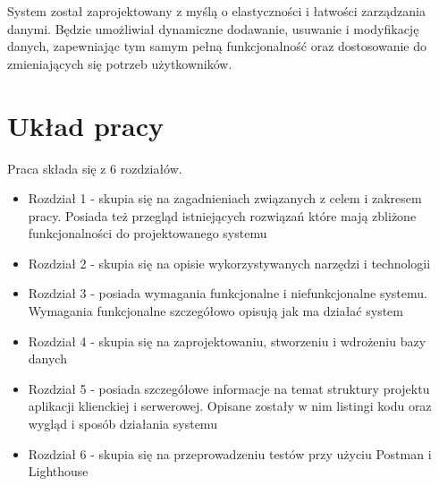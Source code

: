 System został zaprojektowany z myślą o elastyczności i łatwości zarządzania danymi. Będzie umożliwiał dynamiczne dodawanie, usuwanie i modyfikację danych, zapewniając tym samym pełną funkcjonalność oraz dostosowanie do zmieniających się potrzeb użytkowników.


\section{Układ pracy}
Praca składa się z 6 rozdziałów.
\begin {itemize}
	\item Rozdział 1 - skupia się na zagadnieniach związanych z celem i zakresem pracy. Posiada też przegląd istniejących rozwiązań które mają zbliżone funkcjonalności do projektowanego systemu
	\item Rozdział 2 - skupia się na opisie wykorzystywanych narzędzi i technologii
	\item Rozdział 3 - posiada wymagania funkcjonalne i niefunkcjonalne systemu. Wymagania funkcjonalne szczegółowo opisują jak ma działać system
	\item Rozdział 4 - skupia się na zaprojektowaniu, stworzeniu i wdrożeniu bazy danych
	\item Rozdział 5 - posiada szczegółowe informacje na temat struktury projektu aplikacji klienckiej i serwerowej. Opisane zostały w nim listingi kodu oraz wygląd i sposób działania systemu
	\item Rozdział 6 - skupia się na przeprowadzeniu testów przy użyciu Postman i Lighthouse
\end{itemize}



